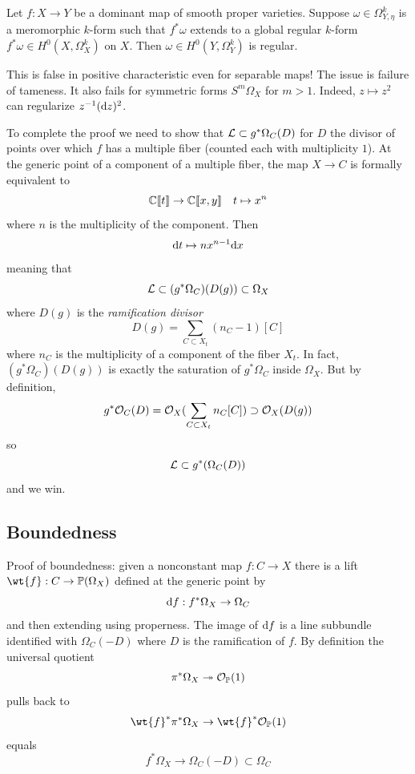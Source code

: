\documentclass[main.tex]{subfiles}
\begin{document}
\begin{lemma}
Let $f : X \to Y$ be a dominant map of smooth proper varieties. Suppose $\omega \in \Omega_{Y,\eta}^k$ is a meromorphic $k$-form such that $f^* \omega$ extends to a global regular $k$-form $f^* \omega \in H^0(X, \Omega_X^k)$ on $X$. Then $\omega \in H^0(Y, \Omega_Y^k)$ is regular.
\end{lemma}

\begin{rmk}
This is false in positive characteristic even for separable maps! The issue is failure of tameness. It also fails for symmetric forms $S^m \Omega_X$ for $m > 1$. Indeed, $z \mapsto z^2$ can regularize $z^{-1} (\mathrm{d}{z})^2$.
\end{rmk}

To complete the proof we need to show that $\mathcal{L} \subset g^* \Omega_C(D)$ for $D$ the divisor of points over which $f$ has a multiple fiber (counted each with multiplicity $1$). At the generic point of a component of a multiple fiber, the map $X \to C$ is formally equivalent to
\[ \mathbb{C}\llbracket t \rrbracket \to \mathbb{C} \llbracket x,y \rrbracket \quad t \mapsto x^n \]
where $n$ is the multiplicity of the component. Then
\[ \mathrm{d}{t} \mapsto n x^{n-1} \mathrm{d}{x} \]
meaning that
\[ \mathcal{L} \subset (g^* \Omega_C)(D(g)) \subset \Omega_X \]
where $D(g)$ is the \textit{ramification divisor}
\[ D(g) = \sum_{C \subset X_t} (n_C - 1) [C] \]
where $n_C$ is the multiplicity of a component of the fiber $X_t$. In fact, $(g^* \Omega_C)(D(g))$ is exactly the saturation of $g^* \Omega_C$ inside $\Omega_X$. But by definition,
\[ g^* \mathcal{O}_{C}(D) = \mathcal{O}_{X}(\sum_{C \subset X_t} n_C [C]) \supset \mathcal{O}_{X}(D(g)) \]
so
\[ \mathcal{L} \subset g^* (\Omega_C(D)) \]
and we win.

\subsection{Boundedness}

Proof of boundedness: given a nonconstant map $f : C \to X$ there is a lift $\wt{f} : C \to \P(\Omega_X)$ defined at the generic point by
\[ \mathrm{d}{f} : f^* \Omega_X \to \Omega_C \]
and then extending using properness. The image of $\mathrm{d}{f}$ is a line subbundle identified with $\Omega_C(-D)$ where $D$ is the ramification of $f$. By definition the universal quotient
\[ \pi^* \Omega_X \twoheadrightarrow \mathcal{O}_{\mathbb{P}}(1) \]
pulls back to
\[ \wt{f}^* \pi^* \Omega_X \to \wt{f}^* \struct{\P}(1) \]
equals
\[ f^* \Omega_X \to \Omega_C(-D) \subset \Omega_C \]
\end{document}
